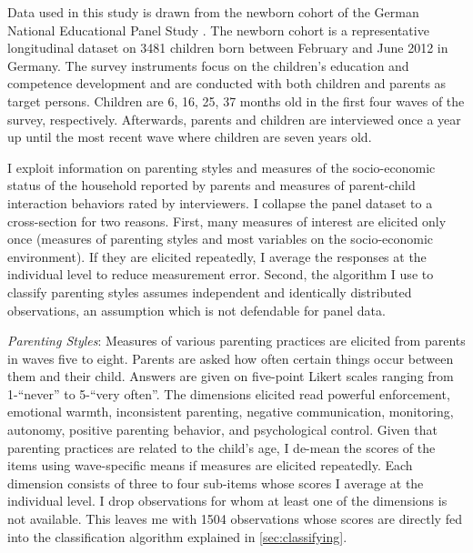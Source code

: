 Data used in this study is drawn from the newborn cohort of the German National Educational Panel Study \parencite[NEPS][]{nepsnationaleducationalpanelstudybamberggermanyNEPSStartingCohort2021}. The newborn cohort is a representative longitudinal dataset on 3481 children born between February and June 2012 in Germany. The survey instruments focus on the children's education and competence development and are conducted with both children and parents as target persons. Children are 6, 16, 25, 37 months old in the first four waves of the survey, respectively. Afterwards, parents and children are interviewed once a year up until the most recent wave where children are seven years old. 

I exploit information on parenting styles and measures of the socio-economic status of the household reported by parents and measures of parent-child interaction behaviors rated by interviewers. I collapse the panel dataset to a cross-section for two reasons. First, many measures of interest are elicited only once (measures of parenting styles and most variables on the socio-economic environment). If they are elicited repeatedly, I average the responses at the individual level to reduce measurement error. Second, the algorithm I use to classify parenting styles assumes independent and identically distributed observations, an assumption which is not defendable for panel data.

\textit{Parenting Styles}: Measures of various parenting practices are elicited from parents in waves five to eight. Parents are asked how often certain things occur between them and their child. Answers are given on five-point Likert scales ranging from 1-``never'' to 5-``very often''. The dimensions elicited read powerful enforcement, emotional warmth, inconsistent parenting, negative communication, monitoring, autonomy, positive parenting behavior, and psychological control. Given that parenting practices are related to the child's age, I de-mean the scores of the items using wave-specific means if measures are elicited repeatedly. Each dimension consists of three to four sub-items whose scores I average at the individual level. I drop observations for whom at least one of the dimensions is not available. This leaves me with 1504 observations whose scores are directly fed into the classification algorithm explained in \ref{sec:classifying}.

